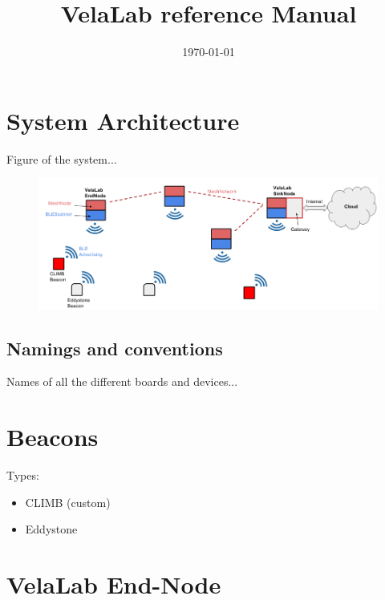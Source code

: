 \documentclass[12pt]{article}
\title{VelaLab reference Manual}
\date{\today}
\begin{document}
\maketitle




\section{System Architecture}

Figure of the system... 

\begin{figure}[h]
	\centering
	\includegraphics[width=0.98\columnwidth]{fig/Architecture.png}
	\caption{}
	\label{fig:system}
\end{figure}



\subsection{Namings and conventions}

Names of all the different boards and devices...


\section{Beacons}

Types:
\begin{itemize}
\item{CLIMB (custom)}
\item{Eddystone}
\end{itemize}




\section{VelaLab End-Node}
\end{document}
